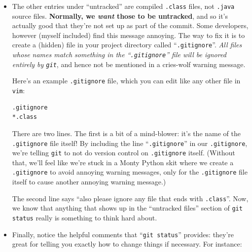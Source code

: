 \begin{itemize}
\item The other entries under ``untracked'' are compiled \texttt{.class}
files, not \texttt{.java} source files. \textbf{Normally, we \textit{want}
those to be untracked}, and so it's actually good that they're not set up as
part of the commit. Some developers, however (myself included) find this
message annoying. The way to fix it is to create a (hidden) file in your
project directory called ``\texttt{.gitignore}''. \textit{All files whose names
match something in the ``\texttt{.gitignore}'' file will be ignored entirely by
\texttt{git}}, and hence not be mentioned in a cries-wolf warning message.

\begin{samepage}
Here's an example \texttt{.gitignore} file, which you can edit like any other
file in \texttt{vim}:

\begin{Verbatim}[fontsize=\small,samepage=true,frame=single]
.gitignore
*.class
\end{Verbatim}
\end{samepage}

There are two lines. The first is a bit of a mind-blower: it's the name of the
\texttt{.gitignore} file itself! By including the line ``\texttt{.gitignore}''
in our \texttt{.gitignore}, we're telling \texttt{git} to not do version
control on \texttt{.gitignore} itself. (Without that, we'll feel like we're
stuck in a Monty Python skit where we create a \texttt{.gitignore} to avoid
annoying warning messages, only for the \texttt{.gitignore} file itself to
cause another annoying warning message.)

The second line says ``also please ignore any file that ends with
\texttt{.class}''. Now, we know that anything that shows up in the ``untracked
files'' section of \texttt{git status} really is something to think hard about.

\item Finally, notice the helpful comments that ``\texttt{git status}''
provides: they're great for telling you exactly how to change things if
necessary. For instance:

\end{itemize}

